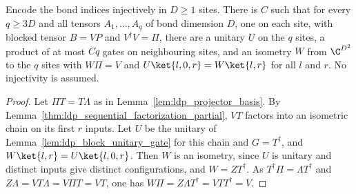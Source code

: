 \begin{lemma}
    \label{thm:ldp_isometric_extension_unitary}
    \leanok
    Encode the bond indices injectively in $D\ge1$ sites. There is $C$ such
    that for every $q\ge3D$ and all tensors $A_1,\dots,A_q$ of bond dimension
    $D$, one on each site, with blocked tensor $B=VP$ and $V^\dagger V=\Pi$,
    there are a unitary $U$ on the $q$ sites, a product of at most $Cq$ gates
    on neighbouring sites, and an isometry $W$ from $\C^{D^2}$ to the $q$
    sites with $W\Pi=V$ and $U\ket{l,0,r}=W\ket{l,r}$ for all $l$ and $r$.
    No injectivity is assumed.
\end{lemma}
\begin{proof}
    \leanok
    Let $\Pi T=T\Lambda$ as in Lemma~\ref{lem:ldp_projector_basis}. By
    Lemma~\ref{thm:ldp_sequential_factorization_partial}, $VT$ factors into an
    isometric chain on its first $r$ inputs. Let $U$ be the unitary of
    Lemma~\ref{lem:ldp_block_unitary_gate} for this chain and $G=T^\dagger$,
    and $W\ket{l,r}=U\ket{l,0,r}$. Then $W$ is an isometry, since $U$ is unitary
    and distinct inputs give distinct configurations, and $W=ZT^\dagger$. As
    $T^\dagger\Pi=\Lambda T^\dagger$ and $Z\Lambda=VT\Lambda=V\Pi T=VT$, one
    has $W\Pi=Z\Lambda T^\dagger=VTT^\dagger=V$.
\end{proof}

